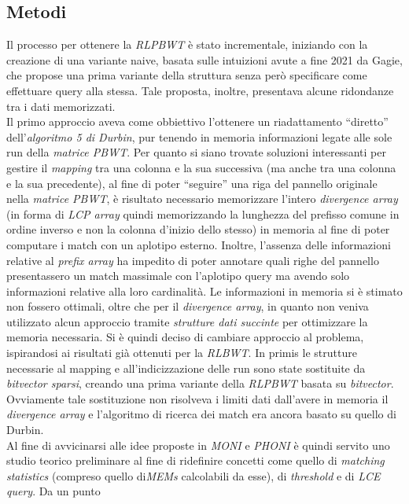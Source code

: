 \documentclass[a4paper,11pt, oneside]{article}
\begin{document}
\subsection*{Metodi}
Il processo per ottenere la \textit{RLPBWT} è stato incrementale,
iniziando con la creazione di una variante naive, basata sulle intuizioni avute
a fine 2021 da Gagie, che propose una prima variante della struttura senza però
specificare come effettuare query alla stessa. Tale proposta, inoltre,
presentava alcune ridondanze tra i dati memorizzati.\\
Il primo approccio aveva come obbiettivo l'ottenere un riadattamento ``diretto''
dell'\textit{algoritmo 5 di Durbin}, pur tenendo in memoria informazioni legate
alle sole run della \textit{matrice PBWT}. Per quanto si siano trovate soluzioni
interessanti per gestire il \textit{mapping} tra una colonna e la sua
successiva (ma anche tra una colonna e la sua precedente), al fine di poter
``seguire'' una riga del pannello originale nella 
\textit{matrice PBWT}, è risultato necessario memorizzare l'intero
\textit{divergence array} (in forma di \textit{LCP array} quindi
memorizzando la lunghezza del prefisso comune in ordine inverso e non la colonna
d'inizio dello stesso) in memoria al fine di poter computare i match con un
aplotipo esterno. Inoltre, l'assenza delle informazioni relative al
\textit{prefix array} ha impedito di poter annotare quali righe del pannello
presentassero un match massimale con l'aplotipo query ma avendo solo
informazioni relative alla loro cardinalità. Le informazioni in memoria si è
stimato non fossero ottimali, oltre che per il \textit{divergence array}, in
quanto non veniva utilizzato alcun approccio tramite \textit{strutture dati
  succinte} per ottimizzare la memoria necessaria. Si è quindi deciso di
cambiare approccio al problema, ispirandosi ai risultati già ottenuti per la
\textit{RLBWT}. In primis le strutture necessarie al mapping e
all'indicizzazione delle run sono state sostituite da \textit{bitvector
  sparsi}, creando una prima variante della \textit{RLPBWT} basata su
\textit{bitvector}. Ovviamente tale sostituzione non risolveva i limiti dati
dall'avere in memoria il \textit{divergence array} e l'algoritmo di ricerca dei
match era ancora basato su quello di Durbin. \\
Al fine di avvicinarsi alle idee proposte in \textit{MONI} e \textit{PHONI} è
quindi servito uno studio teorico preliminare al fine di ridefinire concetti
come quello di \textit{matching statistics} (compreso quello di\textit{MEMs}
calcolabili da esse), di \textit{threshold} e di \textit{LCE query}. Da un punto
\end{document}
